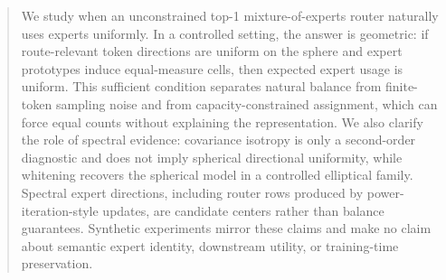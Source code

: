 \begin{abstract}
We study when an unconstrained top-1 mixture-of-experts router naturally uses
experts uniformly. In a controlled setting, the answer is geometric: if
route-relevant token directions are uniform on the sphere and expert prototypes
induce equal-measure cells, then expected expert usage is uniform. This
sufficient condition separates natural balance from finite-token sampling noise
and from capacity-constrained assignment, which can force equal counts without
explaining the representation. We also clarify the role of spectral evidence:
covariance isotropy is only a second-order diagnostic and does not imply
spherical directional uniformity, while whitening recovers the spherical model
in a controlled elliptical family. Spectral expert directions, including router
rows produced by power-iteration-style updates, are candidate centers rather
than balance guarantees. Synthetic experiments mirror these claims and make no
claim about semantic expert identity, downstream utility, or training-time
preservation.
\end{abstract}
